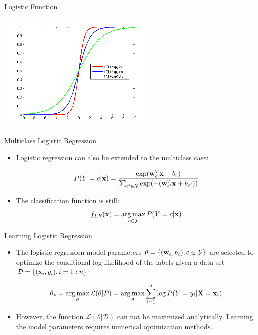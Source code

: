 \documentclass[serif,xcolor=pdftex,dvipsnames,table,hyperref={bookmarks=false}]{beamer}
\begin{document}
\begin{frame}[t]{Logistic Function}

\center
\includegraphics[width=3in]{../Figures/logistic.png}

\end{frame}

\begin{frame}[t]{Multiclass Logistic Regression}

\begin{itemize}
\setlength{\itemsep}{8pt}

\item Logistic regression can also be extended to the multiclass case:

$$P(Y=c|{\mathbf{x}}) = \frac{\exp({\mathbf{w}}_c^T{\mathbf{x}}+b_c)}{\sum_{c'\in \mathcal{Y}} \exp(-({\mathbf{w}}_{c'}^T{\mathbf{x}}+b_{c'})) } $$

\pause \item The classification function is still: 
$$f_{LR}({\mathbf{x}}) = \operatorname*{arg\,max}_{c\in\mathcal{Y}} P(Y=c|{\mathbf{x}})$$

\end{itemize}
\end{frame}

\begin{frame}[t]{Learning Logistic Regression}

\begin{itemize}
\setlength{\itemsep}{12pt}
\item The logistic regression model parameters $\theta = \{({\mathbf{w}}_c, b_c), c\in \mathcal{Y}\}$ are selected to optimize the conditional log likelihood of the labels given a data set $\mathcal{D}=\{({\mathbf{x}}_i,y_i), i=1:n\}$:

\pause
$$\theta_* = \operatorname*{arg\,max}_{\theta}\mathcal{L}(\theta|\mathcal{D}) = \operatorname*{arg\,max}_{\theta}\sum_{i=1}^n \log P(Y=y_i|{\mathbf{X}}={\mathbf{x}}_i)$$

\pause \item However, the function $\mathcal{L}(\theta|\mathcal{D})$ can not be maximized analytically. Learning the model parameters requires numerical optimization methods. 

\end{itemize}
\end{frame}
\end{document}

